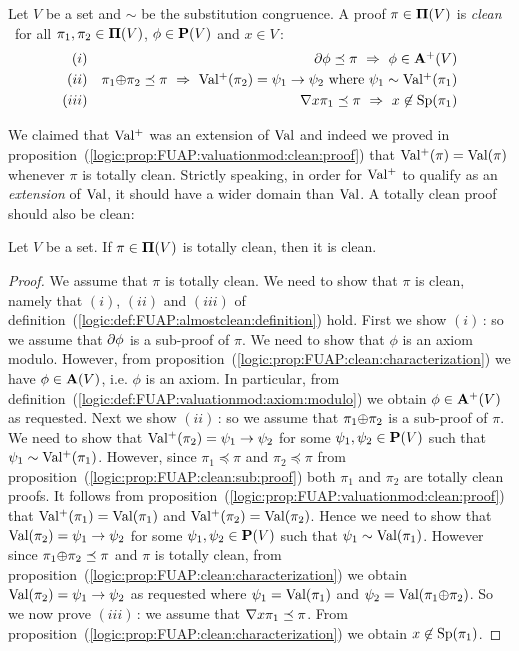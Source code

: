 \begin{defin}\label{logic:def:FUAP:almostclean:definition}
Let $V$ be a set and $\sim$ be the substitution congruence. A proof
$\pi\in\mbox{${\bf\Pi}(V)$}$ is {\em clean} \ifand\ for all
$\pi_{1},\pi_{2}\in\mbox{${\bf\Pi}(V)$}$, $\phi\in\mbox{${\bf P}(V)$}$ and $x\in V$\,:
    \begin{eqnarray*}
    (i)&&\mbox{$\partial$}\phi\preceq\pi\ \Rightarrow\ \phi\in\mbox{${\bf A}^{+}(V)$}\\
    (ii)&&\pi_{1}\mbox{$\oplus$}\pi_{2}\preceq\pi\ \Rightarrow\
    \mbox{$\rm Val^{+}$}(\pi_{2})=\psi_{1}\to\psi_{2}\mbox{ where }\psi_{1}\sim\mbox{$\rm Val^{+}$}(\pi_{1})\\
    (iii)&&\mbox{$\nabla$} x\pi_{1}\preceq\pi\ \Rightarrow\
    x\not\in\mbox{\rm Sp}(\pi_{1})
    \end{eqnarray*}
\end{defin}

We claimed that $\mbox{$\rm Val^{+}$}$ was an extension of $\mbox{\rm Val}$ and indeed we
proved in
proposition~(\ref{logic:prop:FUAP:valuationmod:clean:proof}) that
$\mbox{$\rm Val^{+}$}(\pi)=\mbox{\rm Val}(\pi)$ whenever $\pi$ is totally clean. Strictly
speaking, in order for $\mbox{$\rm Val^{+}$}$ to qualify as an {\em extension} of
$\mbox{\rm Val}$, it should have a wider domain than $\mbox{\rm Val}$. A totally clean
proof should also be clean:
\begin{prop}\label{logic:def:FUAP:almostclean:clean}
Let $V$ be a set. If $\pi\in\mbox{${\bf\Pi}(V)$}$ is totally clean, then it is
clean.
\end{prop}
\begin{proof}
We assume that $\pi$ is totally clean. We need to show that $\pi$ is
clean, namely that $(i)$, $(ii)$ and $(iii)$ of
definition~(\ref{logic:def:FUAP:almostclean:definition}) hold. First
we show $(i)$\,: so we assume that $\mbox{$\partial$}\phi$ is a sub-proof of
$\pi$. We need to show that $\phi$ is an axiom modulo. However, from
proposition~(\ref{logic:prop:FUAP:clean:characterization}) we have
$\phi\in\mbox{${\bf A}(V)$}$, i.e. $\phi$ is an axiom. In particular, from
definition~(\ref{logic:def:FUAP:valuationmod:axiom:modulo}) we
obtain $\phi\in\mbox{${\bf A}^{+}(V)$}$ as requested. Next we show $(ii)$\,: so we
assume that $\pi_{1}\mbox{$\oplus$}\pi_{2}$ is a sub-proof of $\pi$. We need to
show that $\mbox{$\rm Val^{+}$}(\pi_{2})=\psi_{1}\to\psi_{2}$ for some
$\psi_{1},\psi_{2}\in\mbox{${\bf P}(V)$}$ such that $\psi_{1}\sim\mbox{$\rm Val^{+}$}(\pi_{1})$.
However, since $\pi_{1}\preceq\pi$ and $\pi_{2}\preceq\pi$ from
proposition~(\ref{logic:prop:FUAP:clean:sub:proof}) both $\pi_{1}$
and $\pi_{2}$ are totally clean proofs. It follows from
proposition~(\ref{logic:prop:FUAP:valuationmod:clean:proof}) that
$\mbox{$\rm Val^{+}$}(\pi_{1})=\mbox{\rm Val}(\pi_{1})$ and $\mbox{$\rm Val^{+}$}(\pi_{2})=\mbox{\rm Val}(\pi_{2})$.
Hence we need to show that $\mbox{\rm Val}(\pi_{2})=\psi_{1}\to\psi_{2}$ for
some $\psi_{1},\psi_{2}\in\mbox{${\bf P}(V)$}$ such that
$\psi_{1}\sim\mbox{\rm Val}(\pi_{1})$. However since
$\pi_{1}\mbox{$\oplus$}\pi_{2}\preceq\pi$ and $\pi$ is totally clean, from
proposition~(\ref{logic:prop:FUAP:clean:characterization}) we obtain
$\mbox{\rm Val}(\pi_{2})=\psi_{1}\to\psi_{2}$ as requested where
$\psi_{1}=\mbox{\rm Val}(\pi_{1})$ and $\psi_{2}=\mbox{\rm Val}(\pi_{1}\mbox{$\oplus$}\pi_{2})$. So
we now prove $(iii)$\,: we assume that $\mbox{$\nabla$} x\pi_{1}\preceq\pi$.
From proposition~(\ref{logic:prop:FUAP:clean:characterization}) we
obtain $x\not\in\mbox{\rm Sp}(\pi_{1})$.
\end{proof}

